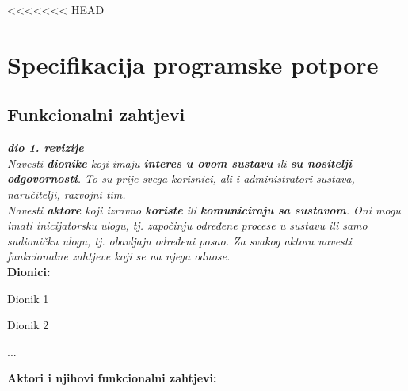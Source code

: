 <<<<<<< HEAD
\chapter{Specifikacija programske potpore}

		
	\section{Funkcionalni zahtjevi}
			
			\textbf{\textit{dio 1. revizije}}\\
			
			\textit{Navesti \textbf{dionike} koji imaju \textbf{interes u ovom sustavu} ili  \textbf{su nositelji odgovornosti}. To su prije svega korisnici, ali i administratori sustava, naručitelji, razvojni tim.}\\
				
			\textit{Navesti \textbf{aktore} koji izravno \textbf{koriste} ili \textbf{komuniciraju sa sustavom}. Oni mogu imati inicijatorsku ulogu, tj. započinju određene procese u sustavu ili samo sudioničku ulogu, tj. obavljaju određeni posao. Za svakog aktora navesti funkcionalne zahtjeve koji se na njega odnose.}\\
			
			
			\noindent \textbf{Dionici:}
			
			\begin{packed_enum}
				
				\item Dionik 1
				\item Dionik 2				
				\item ...
				
			\end{packed_enum}
			
			\noindent \textbf{Aktori i njihovi funkcionalni zahtjevi:}
			
